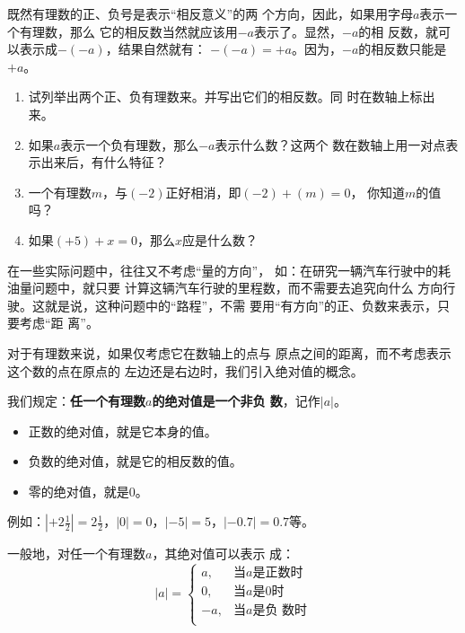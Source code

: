     既然有理数的正、负号是表示“相反意义”的两
个方向，因此，如果用字母$a$表示一个有理数，那么
它的相反数当然就应该用$-a$表示了。显然，$-a$的相
反数，就可以表示成$-(- a)$，结果自然就有：
$-(-a)=+a$。因为，$-a$的相反数只能是$+a$。
    
\begin{ex}
\begin{enumerate}
    \item 试列举出两个正、负有理数来。并写出它们的相反数。同
    时在数轴上标出来。
    \item 如果$a$表示一个负有理数，那么$-a$表示什么数？这两个
    数在数轴上用一对点表示出来后，有什么特征？
    \item 一个有理数$m$，与$(-2)$正好相消，即$(-2)+(m)=0$，
    你知道$m$的值吗？
    \item 如果$(+5) +x=0$，那么$x$应是什么数？
\end{enumerate}    
\end{ex}    
  
在一些实际问题中，往往又不考虑“量的方向”，
如：在研究一辆汽车行驶中的耗油量问题中，就只要
计算这辆汽车行驶的里程数，而不需要去追究向什么
方向行驶。这就是说，这种问题中的“路程”，不需
要用“有方向”的正、负数来表示，只要考虑“距
离”。

    对于有理数来说，如果仅考虑它在数轴上的点与
原点之间的距离，而不考虑表示这个数的点在原点的
左边还是右边时，我们引入绝对值的概念。

    我们规定：\textbf{任一个有理数$a$的绝对值是一个非负
数}，记作$|a|$。

\begin{blk}{}
\begin{itemize}
    \item 正数的绝对值，就是它本身的值。
    \item 负数的绝对值，就是它的相反数的值。
    \item 零的绝对值，就是0。
\end{itemize}
\end{blk}

例如：$\left|+2\frac{1}{2}\right|=2\frac{1}{2}$，$|0|=0$，$|-5|=5$，$|-0.7|=0.7$等。

一般地，对任一个有理数$a$，其绝对值可以表示
成：
\[|a|=\begin{cases}
    a, & \text{当$a$是正数时}\\
    0, & \text{当$a$是0时}\\
    -a, & \text{当$a$是负 数时}\\
\end{cases}\]

